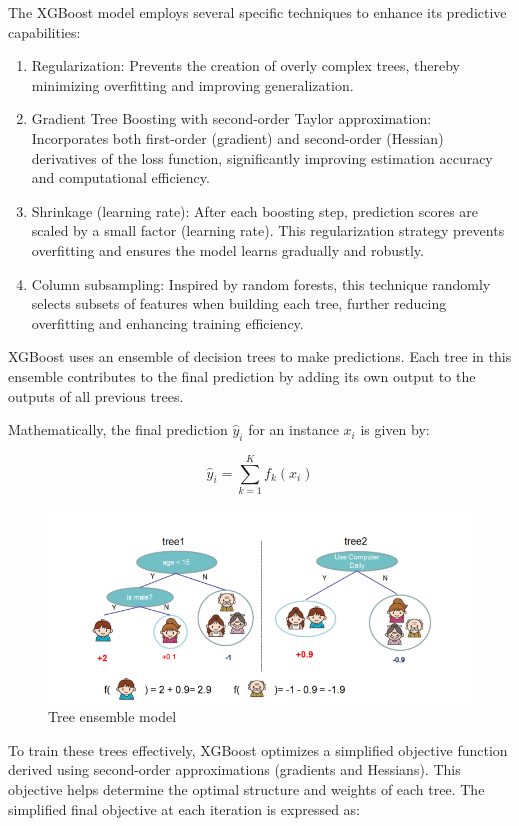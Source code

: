 \documentclass{SGGW-thesis-EN}
\begin{document}
The XGBoost model employs several specific techniques to enhance its predictive capabilities:
\begin{enumerate}
  \item Regularization: Prevents the creation of overly complex trees, thereby minimizing overfitting and improving generalization.
  \item Gradient Tree Boosting with second-order Taylor approximation: Incorporates both first-order (gradient) and second-order (Hessian) derivatives of the loss function, significantly improving estimation accuracy and computational efficiency.
  \item Shrinkage (learning rate): After each boosting step, prediction scores are scaled by a small factor (learning rate). This regularization strategy prevents overfitting and ensures the model learns gradually and robustly.
  \item Column subsampling: Inspired by random forests, this technique randomly selects subsets of features when building each tree, further reducing overfitting and enhancing training efficiency. 
\end{enumerate}
XGBoost uses an ensemble of decision trees to make predictions. 
Each tree in this ensemble contributes to the final prediction by adding its own output to the outputs of all previous trees.

Mathematically, the final prediction $\hat{y}_i$ for an instance $x_i$ is given by:

\begin{figure}[h!]
  \centering
  \begin{minipage}[c]{0.4\textwidth}
      \centering
      \[
      \hat{y}_i = \sum_{k=1}^{K} f_k(x_i)
      \]
  \end{minipage}\hfill
  \begin{minipage}[c]{0.55\textwidth}
      \centering
      \includegraphics[width=\linewidth]{images/tree_ensemble_model.png}
      \caption{Tree ensemble model \cite{Chen_2016}}
      \label{fig:tree_ensemble_model}
  \end{minipage}
\end{figure}
To train these trees effectively, XGBoost optimizes a simplified objective function derived using second-order approximations (gradients and Hessians). 
This objective helps determine the optimal structure and weights of each tree. \newpage The simplified final objective at each iteration is expressed as:
\end{document}
